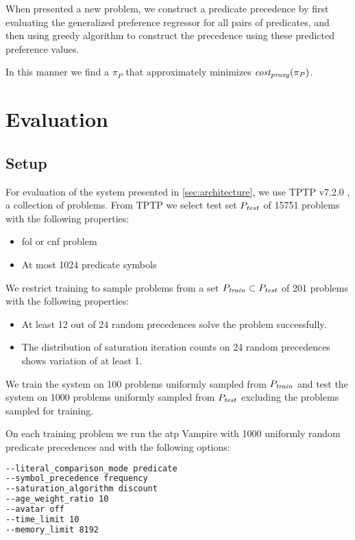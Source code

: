 When presented a new problem, we construct a predicate precedence by
first evaluating the generalized preference regressor for all pairs of predicates,
and then using greedy algorithm to construct the precedence using these predicted preference values.

In this manner we find a \(\pi_P\) that approximately minimizes \(\operatorname{\mathit{cost_{proxy}}}(\pi_P)\).

\section{Evaluation}
\label{sec:evaluation}

\subsection{Setup}

For evaluation of the system presented in \autoref{sec:architecture},
we use TPTP v7.2.0 \cite{?}, a collection of problems.
From TPTP we select test set \(P_{\mathit{test}}\) of 15751 problems with the following properties:

\begin{itemize}
	\item \gls{fol} or \gls{cnf} problem
	\item At most 1024 predicate symbols
\end{itemize}

We restrict training to sample problems from a set
\(P_{\mathit{train}} \subset P_{\mathit{test}}\) of 201 problems
with the following properties:

\begin{itemize}
	\item At least 12 out of 24 random precedences solve the problem successfully.
	\item The distribution of saturation iteration counts on 24 random precedences
	shows variation of at least 1.
\end{itemize}

We train the system on 100 problems uniformly sampled from \(P_{\mathit{train}}\)
and test the system on 1000 problems uniformly sampled from \(P_{\mathit{test}}\)
excluding the problems sampled for training.

On each training problem we run the \gls{atp} Vampire with 1000 uniformly random predicate precedences
and with the following options:

\begin{lstlisting}[language=sh]
--literal_comparison_mode predicate
--symbol_precedence frequency
--saturation_algorithm discount
--age_weight_ratio 10
--avatar off
--time_limit 10
--memory_limit 8192
\end{lstlisting}

